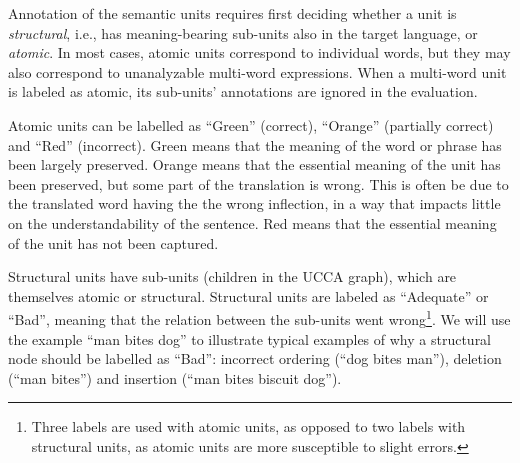 \documentclass[11pt,letterpaper]{article}
\newcommand{\XXX}[1]{{\color{red}XXX #1}} %
\begin{document}
Annotation of the semantic units requires first deciding whether
a unit is {\it structural}, i.e., has meaning-bearing sub-units also in the
target language,
or {\it atomic}. In most cases, atomic units
correspond to individual words, but they may also correspond to unanalyzable
multi-word expressions.
When a multi-word unit is labeled as atomic, its sub-units' annotations are ignored
in the evaluation.

Atomic units can be labelled as ``Green'' (correct), ``Orange'' (partially correct)
and ``Red'' (incorrect). 
Green means that the meaning of the word or phrase has been largely preserved.
Orange means that the essential meaning of the unit has been preserved,
but some part of the translation is wrong.
This is often be due to the translated word having the the wrong inflection,
in a way that impacts little on the understandability of the sentence.
Red means that the essential meaning of the unit has not been captured.

Structural units have sub-units (children in the UCCA graph),
which are themselves atomic or structural.
Structural units are labeled as ``Adequate'' or ``Bad'', meaning
that the relation between the sub-units went wrong\footnote{
  Three labels are used with atomic units, as opposed to two labels with structural units,
as atomic units are more susceptible to slight errors.}.
We will use the example ``man bites dog'' to illustrate typical examples of why a structural node
should be labelled as ``Bad'':
incorrect ordering (``dog bites man''), 
deletion (``man bites'') and insertion (``man bites biscuit dog''). 
\end{document}
